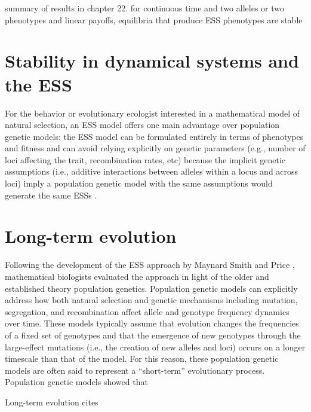 \documentclass[11pt]{article}
\begin{document}

summary of results in chapter 22. for continuous time and two alleles or two phenotypes and linear payoffs, equilibria that produce ESS phenotypes are stable \cite{Hofbauer:Sigmund:1998}

\section{Stability in dynamical systems and the ESS}

For the behavior or evolutionary ecologist interested in a mathematical model of natural selection, an ESS model offers one main advantage over population genetic models: the ESS model can be formulated entirely in terms of phenotypes and fitness and can avoid relying explicitly on genetic parameters (e.g., number of loci affecting the trait, recombination rates, etc) because the implicit genetic assumptions (i.e., additive interactions between alleles within a locus and across loci) imply a population genetic model with the same assumptions would generate the same ESSs \cite{Eshel:1982}.



\section{Long-term evolution}

Following the development of the ESS approach by Maynard Smith and Price \cite{Maynard-Smith:Price:1973}, mathematical biologists evaluated the approach in light of the older and established theory population genetics. Population genetic models can explicitly address how both natural selection and genetic mechanisms including mutation, segregation, and recombination affect allele and genotype frequency dynamics over time. These models typically assume that evolution changes the frequencies of a fixed set of genotypes and that the emergence of new genotypes through the large-effect mutations (i.e., the creation of new alleles and loci) occurs on a longer timescale than that of the model. For this reason, these population genetic models are often said to represent a ``short-term'' evolutionary process. Population genetic models showed that \cite{Cavalli-Sforza:Feldman:1978,Eshel:1982}



Long-term evolution cites \cite{Eshel:1996,Hammerstein:1996,Weissing:1996}
\end{document}
